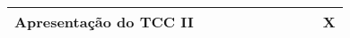 \begin{table}[h]
\begin{tabular}{|l|l|l|l|l|l|l|l|l|l|}
		Apresentação do TCC II                                                             &                                                                                  &                                                                                  &                                                             &                                                                                  &                                                                                  &                                                                                  &                                                                                  &                                                                                  & X                                                                                \\ \hline
	\end{tabular}
\end{table}